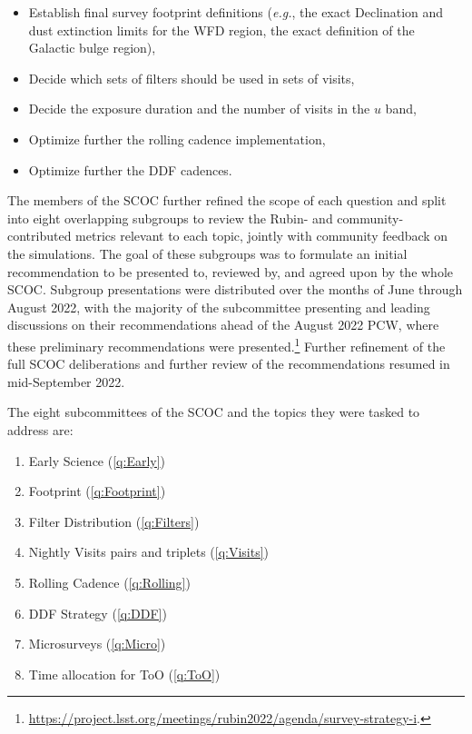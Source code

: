 
\begin{itemize}
\item Establish final survey footprint definitions (\emph{e.g.}, the exact Declination and dust extinction limits for the WFD region, the exact definition of the Galactic bulge region),
\item Decide which sets of filters should be used in sets of visits,
\item Decide the exposure duration and the number of visits in the $u$ band,
\item Optimize further the rolling cadence implementation,
\item Optimize further the DDF cadences.

\end{itemize}

The members of the SCOC further refined the scope of each question and split into eight overlapping subgroups to review the Rubin- and community-contributed metrics relevant to each topic, jointly with community feedback on the simulations. 
The goal of these subgroups was to formulate an initial recommendation to be presented to, reviewed by, and agreed upon by the whole SCOC. Subgroup presentations were distributed over the months of June through August 2022, with the majority of the subcommittee presenting and leading discussions on their recommendations ahead of the August 2022 PCW, where these preliminary recommendations were presented.\footnote{\url{https://project.lsst.org/meetings/rubin2022/agenda/survey-strategy-i}.} Further refinement of the full SCOC deliberations and further review of the recommendations resumed in mid-September 2022.

The eight subcommittees of the SCOC  and the topics they were tasked to address are:
\begin{enumerate}
\item{Early Science} (\autoref{q:Early})

\item{Footprint} (\autoref{q:Footprint})

\item{Filter Distribution} (\autoref{q:Filters})

\item{Nightly Visits pairs and triplets} (\autoref{q:Visits})

\item{Rolling Cadence} (\autoref{q:Rolling})

\item{DDF Strategy} (\autoref{q:DDF})


\item{Microsurveys} (\autoref{q:Micro})

\item{Time allocation for ToO} (\autoref{q:ToO})

\end{enumerate}

